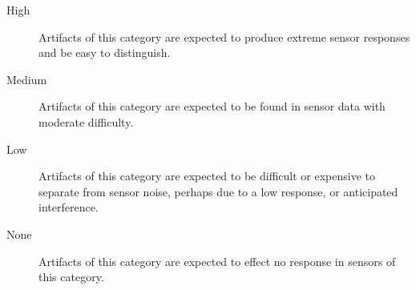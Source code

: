 \begin{description}
	\item[High] Artifacts of this category are expected to produce extreme sensor responses and be easy to distinguish.
	\item[Medium] Artifacts of this category are expected to be found in sensor data with moderate difficulty.
	\item[Low] Artifacts of this category are expected to be difficult or expensive to separate from sensor noise, perhaps due to a low response, or anticipated interference.
	\item[None] Artifacts of this category are expected to effect no response in sensors of this category.
\end{description}

